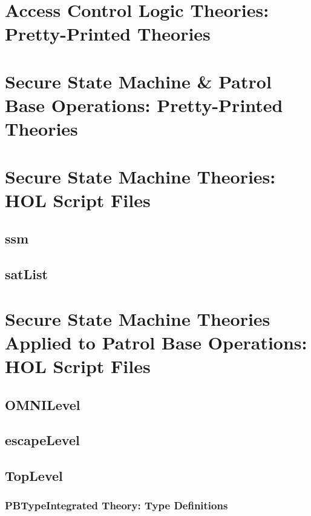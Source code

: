\documentclass[hidelinks,12pt,a4paper]{report}
\begin{document}
\begin{appendices}
\chapter{Access Control Logic Theories: Pretty-Printed Theories}\label{ppacl}


\chapter{Secure State Machine \& Patrol Base Operations: Pretty-Printed Theories }


\chapter{Secure State Machine Theories: HOL Script Files}\label{app:ssms}
\section{ssm}

\section{satList}



\chapter{Secure State Machine Theories Applied to Patrol Base Operations: HOL Script Files}
\section{OMNILevel}


\section{escapeLevel}
%

\section{TopLevel}
\subsection{PBTypeIntegrated Theory: Type Definitions}


\end{appendices}
\end{document}
